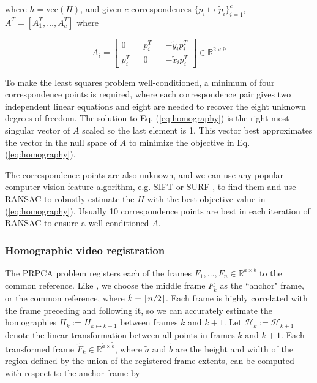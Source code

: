\documentclass[10pt,twocolumn,letterpaper]{article}
\DeclarePairedDelimiter\floor{\lfloor}{\rfloor}
\begin{document}
\noindent where $h= \text{vec}(H)$, and given $c$ correspondences $\{p_i \mapsto \tilde{p}_i \}_{i=1}^c$, $A^T = [A_1^T, \ldots, A_c^T]$ where

\begin{equation*}
	A_i = \begin{bmatrix} 0 && p_i^T && -\tilde{y}_i p_i^T \\ p_i^T && 0 && -\tilde{x}_i p_i^T \end{bmatrix} \in \mathbb{R}^{2\times9}
\end{equation*}

To make the least squares problem well-conditioned, a minimum of four correspondence points is required, where each correspondence pair gives two independent linear equations and eight are needed to recover the eight unknown degrees of freedom. The solution to Eq. (\ref{eq:homography}) is the right-most singular vector of $A$ scaled so the last element is 1. This vector best approximates the vector in the null space of $A$ to minimize the objective in Eq.  (\ref{eq:homography}).

The correspondence points are also unknown, and we can use any popular computer vision feature algorithm, e.g. SIFT \cite{Lowe2004} or SURF \cite{SURF}, to find them and use RANSAC \cite{ransac} to robustly estimate the $H$ with the best objective value in (\ref{eq:homography}). Usually 10 correspondence points are best in each iteration of RANSAC to ensure a well-conditioned $A$.

\subsubsection{Homographic video registration}
The PRPCA problem registers each of the frames $F_1, \ldots, F_n \in \mathbb{R}^{a \times b}$ to the common reference. Like \cite{B.Moore}, we choose the middle frame $F_{\tilde{k}}$ as the ``anchor" frame, or the common reference, where $\tilde{k} = \floor{n/2}$. Each frame is highly correlated with the frame preceding and following it, so we can accurately estimate the homographies $H_k := H_{k \mapsto k+1}$ between frames $k$ and $k+1$. Let $\mathcal{H}_k := \mathcal{H}_{k+1}$ denote the linear transformation between all points in frames $k$ and $k+1$. Each transformed frame $\tilde{F}_k \in \mathbb{R}^{\tilde{a} \times \tilde{b}}$, where $\tilde{a}$ and $\tilde{b}$ are the height and width of the region defined by the union of the registered frame extents, can be computed with respect to the anchor frame by
\end{document}
